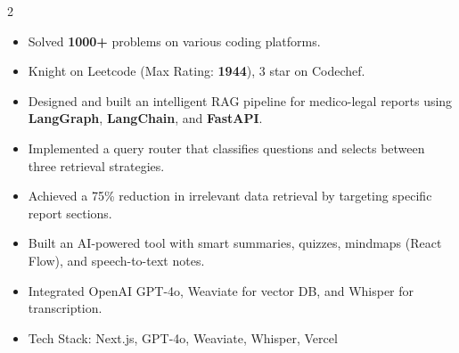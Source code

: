\documentclass[10pt,a4paper]{altacv}
\begin{document}
\begin{paracol}{2}
\vspace{0.3cm}


\begin{itemize}
\item Solved \textbf{1000+} problems on various coding platforms.
\item Knight on Leetcode (Max Rating: \textbf{1944}), 3 star on Codechef.
\end{itemize}

\vspace{0.3cm}


\begin{itemize}
\item Designed and built an intelligent RAG pipeline for medico-legal reports using \textbf{LangGraph}, \textbf{LangChain}, and \textbf{FastAPI}.
\item Implemented a query router that classifies questions and selects between three retrieval strategies.
\item Achieved a 75\% reduction in irrelevant data retrieval by targeting specific report sections.
\end{itemize}
\divider

\begin{itemize}
\item Built an AI-powered tool with smart summaries, quizzes, mindmaps (React Flow), and speech-to-text notes.
\item Integrated OpenAI GPT-4o, Weaviate for vector DB, and Whisper for transcription.
\item Tech Stack: Next.js, GPT-4o, Weaviate, Whisper, Vercel
\end{itemize}

\end{paracol}
\end{document}
